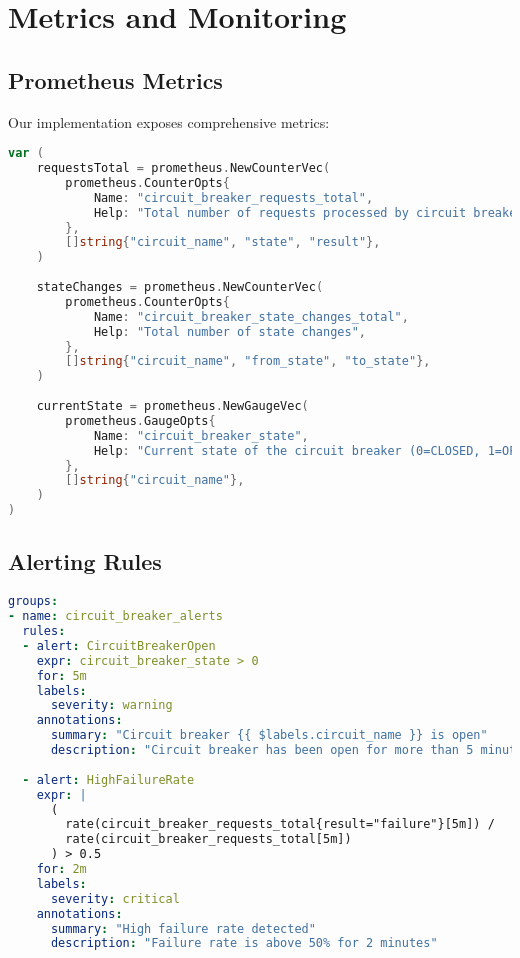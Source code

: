 \documentclass[12pt,a4paper]{article}
\begin{document}
\section{Metrics and Monitoring}

\subsection{Prometheus Metrics}

Our implementation exposes comprehensive metrics:

\begin{lstlisting}[language=Go, caption=Circuit Breaker Metrics]
var (
    requestsTotal = prometheus.NewCounterVec(
        prometheus.CounterOpts{
            Name: "circuit_breaker_requests_total",
            Help: "Total number of requests processed by circuit breaker",
        },
        []string{"circuit_name", "state", "result"},
    )
    
    stateChanges = prometheus.NewCounterVec(
        prometheus.CounterOpts{
            Name: "circuit_breaker_state_changes_total",
            Help: "Total number of state changes",
        },
        []string{"circuit_name", "from_state", "to_state"},
    )
    
    currentState = prometheus.NewGaugeVec(
        prometheus.GaugeOpts{
            Name: "circuit_breaker_state",
            Help: "Current state of the circuit breaker (0=CLOSED, 1=OPEN, 2=HALF_OPEN)",
        },
        []string{"circuit_name"},
    )
)
\end{lstlisting}

\subsection{Alerting Rules}

\begin{lstlisting}[language=yaml, caption=Prometheus Alerting Rules]
groups:
- name: circuit_breaker_alerts
  rules:
  - alert: CircuitBreakerOpen
    expr: circuit_breaker_state > 0
    for: 5m
    labels:
      severity: warning
    annotations:
      summary: "Circuit breaker {{ $labels.circuit_name }} is open"
      description: "Circuit breaker has been open for more than 5 minutes"
      
  - alert: HighFailureRate
    expr: |
      (
        rate(circuit_breaker_requests_total{result="failure"}[5m]) /
        rate(circuit_breaker_requests_total[5m])
      ) > 0.5
    for: 2m
    labels:
      severity: critical
    annotations:
      summary: "High failure rate detected"
      description: "Failure rate is above 50% for 2 minutes"
\end{lstlisting}
\end{document}
